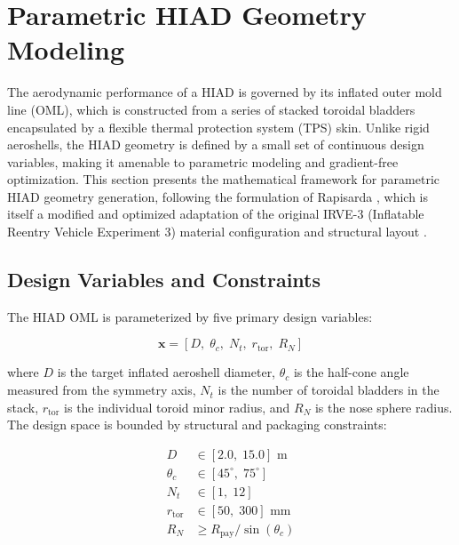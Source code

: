 \section{Parametric HIAD Geometry Modeling}

The aerodynamic performance of a HIAD is governed by its inflated outer mold line (OML), which is constructed from a series of stacked toroidal bladders encapsulated by a flexible thermal protection system (TPS) skin. Unlike rigid aeroshells, the HIAD geometry is defined by a small set of continuous design variables, making it amenable to parametric modeling and gradient-free optimization. This section presents the mathematical framework for parametric HIAD geometry generation, following the formulation of Rapisarda \cite{rapisarda2023mdao}, which is itself a modified and optimized adaptation of the original IRVE-3 (Inflatable Reentry Vehicle Experiment 3) material configuration and structural layout \cite{dillman2015irve3, old2013irve3postflight}.

\subsection{Design Variables and Constraints}

The HIAD OML is parameterized by five primary design variables:

\begin{equation}
    \mathbf{x} = \left[ D,\; \theta_c,\; N_t,\; r_{\text{tor}},\; R_N \right]
    \label{eq:hiad_design_variables}
\end{equation}

\noindent where $D$ is the target inflated aeroshell diameter, $\theta_c$ is the half-cone angle measured from the symmetry axis, $N_t$ is the number of toroidal bladders in the stack, $r_{\text{tor}}$ is the individual toroid minor radius, and $R_N$ is the nose sphere radius. The design space is bounded by structural and packaging constraints:

\begin{equation}
    \begin{aligned}
        D &\in [2.0,\; 15.0] \text{ m} \\
        \theta_c &\in [45^\circ,\; 75^\circ] \\
        N_t &\in [1,\; 12] \\
        r_{\text{tor}} &\in [50,\; 300] \text{ mm} \\
        R_N &\geq R_{\text{pay}} / \sin(\theta_c)
    \end{aligned}
    \label{eq:design_bounds}
\end{equation}

